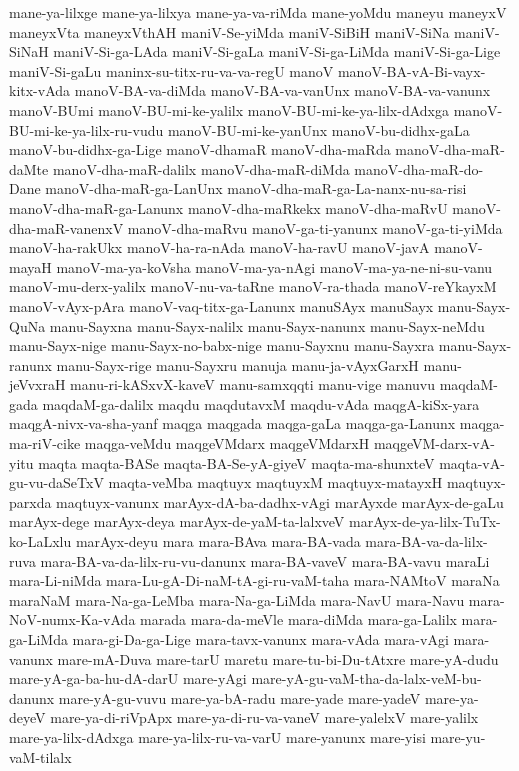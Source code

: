 {mane-ya-lilxge
mane-ya-lilxya
mane-ya-va-riMda
mane-yoMdu
maneyu
maneyxV
maneyxVta
maneyxVthAH
maniV-Se-yiMda
maniV-SiBiH
maniV-SiNa
maniV-SiNaH
maniV-Si-ga-LAda
maniV-Si-gaLa
maniV-Si-ga-LiMda
maniV-Si-ga-Lige
maniV-Si-gaLu
maninx-su-titx-ru-va-va-regU
manoV
manoV-BA-vA-Bi-vayx-kitx-vAda
manoV-BA-va-diMda
manoV-BA-va-vanUnx
manoV-BA-va-vanunx
manoV-BUmi
manoV-BU-mi-ke-yalilx
manoV-BU-mi-ke-ya-lilx-dAdxga
manoV-BU-mi-ke-ya-lilx-ru-vudu
manoV-BU-mi-ke-yanUnx
manoV-bu-didhx-gaLa
manoV-bu-didhx-ga-Lige
manoV-dhamaR
manoV-dha-maRda
manoV-dha-maR-daMte
manoV-dha-maR-dalilx
manoV-dha-maR-diMda
manoV-dha-maR-do-Dane
manoV-dha-maR-ga-LanUnx
manoV-dha-maR-ga-La-nanx-nu-sa-risi
manoV-dha-maR-ga-Lanunx
manoV-dha-maRkekx
manoV-dha-maRvU
manoV-dha-maR-vanenxV
manoV-dha-maRvu
manoV-ga-ti-yanunx
manoV-ga-ti-yiMda
manoV-ha-rakUkx
manoV-ha-ra-nAda
manoV-ha-ravU
manoV-javA
manoV-mayaH
manoV-ma-ya-koVsha
manoV-ma-ya-nAgi
manoV-ma-ya-ne-ni-su-vanu
manoV-mu-derx-yalilx
manoV-nu-va-taRne
manoV-ra-thada
manoV-reYkayxM
manoV-vAyx-pAra
manoV-vaq-titx-ga-Lanunx
manuSAyx
manuSayx
manu-Sayx-QuNa
manu-Sayxna
manu-Sayx-nalilx
manu-Sayx-nanunx
manu-Sayx-neMdu
manu-Sayx-nige
manu-Sayx-no-babx-nige
manu-Sayxnu
manu-Sayxra
manu-Sayx-ranunx
manu-Sayx-rige
manu-Sayxru
manuja
manu-ja-vAyxGarxH
manu-jeVvxraH
manu-ri-kASxvX-kaveV
manu-samxqqti
manu-vige
manuvu
maqdaM-gada
maqdaM-ga-dalilx
maqdu
maqdutavxM
maqdu-vAda
maqgA-kiSx-yara
maqgA-nivx-va-sha-yanf
maqga
maqgada
maqga-gaLa
maqga-ga-Lanunx
maqga-ma-riV-cike
maqga-veMdu
maqgeVMdarx
maqgeVMdarxH
maqgeVM-darx-vA-yitu
maqta
maqta-BASe
maqta-BA-Se-yA-giyeV
maqta-ma-shunxteV
maqta-vA-gu-vu-daSeTxV
maqta-veMba
maqtuyx
maqtuyxM
maqtuyx-matayxH
maqtuyx-parxda
maqtuyx-vanunx
marAyx-dA-ba-dadhx-vAgi
marAyxde
marAyx-de-gaLu
marAyx-dege
marAyx-deya
marAyx-de-yaM-ta-lalxveV
marAyx-de-ya-lilx-TuTx-ko-LaLxlu
marAyx-deyu
mara
mara-BAva
mara-BA-vada
mara-BA-va-da-lilx-ruva
mara-BA-va-da-lilx-ru-vu-danunx
mara-BA-vaveV
mara-BA-vavu
maraLi
mara-Li-niMda
mara-Lu-gA-Di-naM-tA-gi-ru-vaM-taha
mara-NAMtoV
maraNa
maraNaM
mara-Na-ga-LeMba
mara-Na-ga-LiMda
mara-NavU
mara-Navu
mara-NoV-numx-Ka-vAda
marada
mara-da-meVle
mara-diMda
mara-ga-Lalilx
mara-ga-LiMda
mara-gi-Da-ga-Lige
mara-tavx-vanunx
mara-vAda
mara-vAgi
mara-vanunx
mare-mA-Duva
mare-tarU
maretu
mare-tu-bi-Du-tAtxre
mare-yA-dudu
mare-yA-ga-ba-hu-dA-darU
mare-yAgi
mare-yA-gu-vaM-tha-da-lalx-veM-bu-danunx
mare-yA-gu-vuvu
mare-ya-bA-radu
mare-yade
mare-yadeV
mare-ya-deyeV
mare-ya-di-riVpApx
mare-ya-di-ru-va-vaneV
mare-yalelxV
mare-yalilx
mare-ya-lilx-dAdxga
mare-ya-lilx-ru-va-varU
mare-yanunx
mare-yisi
mare-yu-vaM-tilalx
}
